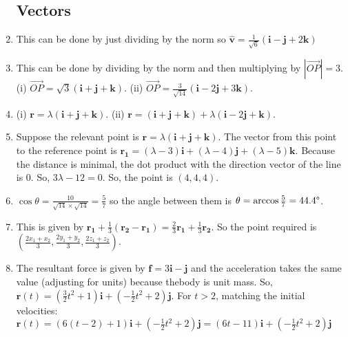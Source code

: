\documentclass{article}
\begin{document}
\begin{enumerate}
\subsection{Vectors}
    \item This can be done by just dividing by the norm so $\hat{\boldsymbol{v}}=\frac{1}{\sqrt{6}} (\boldsymbol{i}-\boldsymbol{j}+2\boldsymbol{k})$
    \item This can be done by dividing by the norm and then multiplying by $|\vec{OP}|=3$. (i) $\vec{OP}=\sqrt{3}(\boldsymbol{i}+\boldsymbol{j}+\boldsymbol{k})$. (ii) $\vec{OP}=\frac{3}{\sqrt{14}} (\boldsymbol{i}-2\boldsymbol{j}+3\boldsymbol{k})$.
    \item (i) $\boldsymbol{r}=\lambda (\boldsymbol{i}+\boldsymbol{j}+\boldsymbol{k})$. (ii) $\boldsymbol{r}=(\boldsymbol{i}+\boldsymbol{j}+\boldsymbol{k})+\lambda (\boldsymbol{i}-2\boldsymbol{j}+\boldsymbol{k})$.
    \item Suppose the relevant point is $\boldsymbol{r}=\lambda (\boldsymbol{i}+\boldsymbol{j}+\boldsymbol{k})$. The vector from this point to the reference point is $\boldsymbol{r_1}=(\lambda - 3)\boldsymbol{i} + (\lambda-4) \boldsymbol{j}+(\lambda-5)\boldsymbol{k}$. Because the distance is minimal, the dot product with the direction vector of the line is 0. So, $3\lambda-12=0$. So, the point is $(4,4,4)$.
    \item $\cos{\theta}= \frac{10}{\sqrt{14}\times \sqrt{14}}=\frac{5}{7}$ so the angle between them is $\theta = \arccos{\frac{5}{7}}=44.4 \degree$.
    \item This is given by $\boldsymbol{r_1}+\frac{1}{3}(\boldsymbol{r_2}-\boldsymbol{r_1})=\frac{2}{3} \boldsymbol{r_1}+\frac{1}{3} \boldsymbol{r_2}$. So the point required is $(\frac{2x_1+x_2}{3},\frac{2y_1+y_2}{3},\frac{2z_1+z_2}{3})$.
    \item The resultant force is given by $\boldsymbol{f}=3\boldsymbol{i}-\boldsymbol{j}$ and the acceleration takes the same value (adjusting for units) because thebody is unit mass. So, $\boldsymbol{r}(t)=(\frac{3}{2}t^2 + 1)\boldsymbol{i} + (-\frac{1}{2}t^2 +2)\boldsymbol{j}$. For $t>2$, matching the initial velocities: $\boldsymbol{r}(t)=(6(t-2)+1)\boldsymbol{i}+(-\frac{1}{2}t^2 +2)\boldsymbol{j}=(6t-11)\boldsymbol{i}+(-\frac{1}{2}t^2 +2)\boldsymbol{j}$
\end{enumerate}
\end{document}
